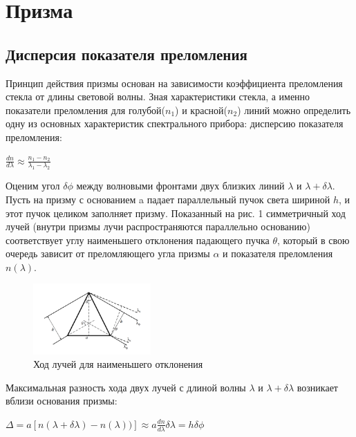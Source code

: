 \section*{Призма}

\subsection*{Дисперсия показателя преломления}

Принцип действия призмы основан на зависимости коэффициента преломления стекла от длины световой волны. Зная характеристики стекла, а именно показатели преломления для голубой($n_{1}$) и красной($n_{2}$) линий можно определить одну из основных характеристик спектрального прибора: дисперсию показателя преломления: 

\begin{center}
	{\Large $\frac{dn}{d\lambda} \approx \frac{n_{1} - n_{2}}{\lambda_{1} - \lambda_{2}}$}
\end{center}
	
Оценим угол $\delta\phi$ между волновыми фронтами двух близких линий $\lambda$ и $\lambda + \delta\lambda$. Пусть на призму с основанием a падает параллельный пучок света шириной $h$, и этот пучок целиком заполняет призму. Показанный на рис. 1 симметричный ход лучей (внутри призмы лучи распространяются параллельно основанию) соответствует углу наименьшего отклонения падающего пучка $\theta$, который в свою очередь зависит от преломляющего угла призмы $\alpha$ и показателя преломления $n(\lambda)$.

\begin{figure}[H]
	\centering
	\includegraphics[width=0.4\textwidth]{../Изображения/Ход лучей для наименьшего отклонения.png}
	\caption{Ход лучей для наименьшего отклонения}
\end{figure}

Максимальная разность хода двух лучей с длиной волны $\lambda$ и $\lambda + \delta \lambda$ возникает вблизи основания призмы:

\begin{center}
	{\Large $\Delta = a[n(\lambda + \delta\lambda) - n(\lambda))] \approx a\frac{dn}{d\lambda}\delta\lambda = h\delta\phi$}
\end{center}

